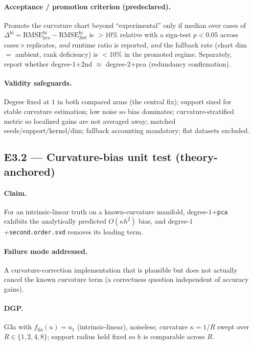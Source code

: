 \documentclass[11pt]{article}
\newcommand{\code}[1]{\texttt{#1}}
\newcommand{\rmse}{\mathrm{RMSE}}
\begin{document}
\paragraph{Acceptance / promotion criterion (predeclared).} Promote the curvature chart beyond
``experimental'' only if median over cases of $\Delta^{\mathrm{hi}}=\rmse^{\mathrm{hi}}_{\mathrm{pca}}-\rmse^{\mathrm{hi}}_{\mathrm{2nd}}$
is $>10\%$ relative with a sign-test $p<0.05$ across cases\,$\times$\,replicates, \emph{and}
runtime ratio is reported, \emph{and} the fallback rate (chart dim $=$ ambient, rank deficiency)
is $<10\%$ in the promoted regime. Separately, report whether degree-$1$+2nd $\approx$
degree-$2$+pca (redundancy confirmation).

\paragraph{Validity safeguards.} Degree fixed at $1$ in both compared arms (the central fix);
support sized for stable curvature estimation; low noise so bias dominates; curvature-stratified
metric so localized gains are not averaged away; matched seeds/support/kernel/dim; fallback
accounting mandatory; flat datasets excluded.

\subsection{E3.2 — Curvature-bias unit test (theory-anchored)}

\paragraph{Claim.} For an intrinsic-linear truth on a known-curvature manifold, degree-$1$+\code{pca}
exhibits the analytically predicted $O(\kappa h^2)$ bias, and degree-$1$+\code{second.order.svd}
removes its leading term.

\paragraph{Failure mode addressed.} A curvature-correction implementation that is plausible but
does not actually cancel the known curvature term (a correctness question independent of accuracy
gains).

\paragraph{DGP.} G3a with $f_{\mathrm{lin}}(u)=u_1$ (intrinsic-linear), noiseless; curvature
$\kappa=1/R$ swept over $R\in\{1,2,4,8\}$; support radius held fixed so $h$ is comparable across $R$.
\end{document}
